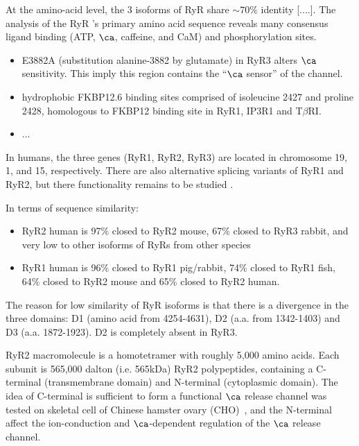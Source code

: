 \begin{framed}
  At the amino-acid level, the 3 isoforms of RyR share $\sim 70\%$
  identity [....]. The analysis of the RyR 's primary amino acid
  sequence reveals many consensus ligand binding (ATP, $\ca$,
  caffeine, and CaM) and phosphorylation sites.

  \begin{itemize}

    \item E3882A (substitution alanine-3882 by glutamate) in RyR3 alters
    $\ca$ sensitivity. This imply this region contains the ``$\ca$
    sensor'' of the channel.
  
    \item hydrophobic FKBP12.6 binding sites comprised of isoleucine
    2427 and proline 2428, homologous to FKBP12 binding site in RyR1,
    IP3R1 and T$\beta$RI.
  
    \item ...
  \end{itemize}
\end{framed}

In humans, the  three genes (RyR1, RyR2, RyR3) are located in chromosome 19, 1,
and 15, respectively. There are also alternative splicing variants of RyR1 and
RyR2, but there functionality remains to be studied \citep{sutko1996}.

In terms of sequence similarity:
\begin{itemize}
  
  \item RyR2 human is 97\% closed to RyR2 mouse, 67\%
closed to RyR3 rabbit, and very low to other isoforms of RyRs from other species
  
  \item RyR1 human is 96\% closed to RyR1 pig/rabbit, 74\% closed to RyR1 fish,
64\% closed to RyR2 mouse and 65\% closed to RyR2 human.
\end{itemize}
The reason for low similarity of RyR isoforms is that there is a divergence in
the three domains: D1 (amino acid from 4254-4631), D2 (a.a. from 1342-1403) and
D3 (a.a. 1872-1923). D2 is completely absent in RyR3. 



RyR2 macromolecule is a homotetramer with roughly 5,000 amino
acids. Each subunit is 565,000 dalton (i.e. 565kDa) RyR2 polypeptides,
containing a C-terminal (transmembrane domain) and N-terminal
(cytoplasmic domain). The idea of C-terminal is sufficient to form a
functional $\ca$ release channel was tested on skeletal cell of
Chinese hamster ovary (CHO)~\citep{Bhat1997}, and the N-terminal
affect the ion-conduction and $\ca$-dependent regulation of the $\ca$
release channel. 

